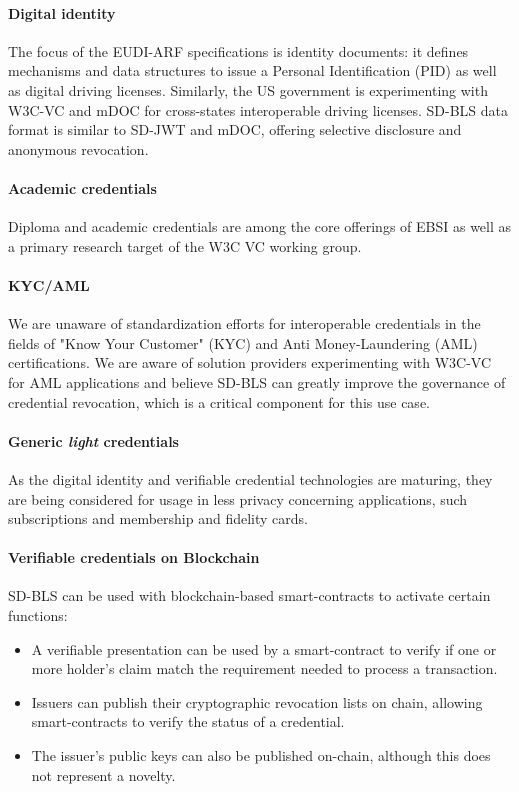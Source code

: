 \paragraph{Digital identity}
The focus of the EUDI-ARF specifications is identity documents: it defines mechanisms and data structures to issue a Personal Identification (PID) as well as digital driving licenses. Similarly, the US government is experimenting with W3C-VC and mDOC for cross-states interoperable driving licenses. SD-BLS data format is similar to SD-JWT and mDOC, offering selective disclosure and anonymous revocation.

\paragraph{Academic credentials}
Diploma and academic credentials are among the core offerings of EBSI as well as a primary research target of the W3C VC working group.

\paragraph{KYC/AML}
We are unaware of standardization efforts for interoperable credentials in the fields of "Know Your Customer" (KYC) and Anti Money-Laundering (AML) certifications. We are aware of solution providers experimenting with W3C-VC for AML applications and believe SD-BLS can greatly improve the governance of credential revocation, which is a critical component for this use case.

\paragraph{Generic \textit{light} credentials}
As the digital identity and verifiable credential technologies are maturing, they are being considered for usage in less privacy concerning applications, such subscriptions and membership and fidelity cards.

\paragraph{Verifiable credentials on Blockchain}
SD-BLS can be used with blockchain-based smart-contracts to activate certain functions:
\begin{itemize}
    \item A verifiable presentation can be used by a smart-contract to verify if one or more holder's claim match the requirement needed to process a transaction.
    \item Issuers can publish their cryptographic revocation lists on chain, allowing smart-contracts to verify the status of a credential.
    \item The issuer's public keys can also be published on-chain, although this does not represent a novelty.
\end{itemize}

